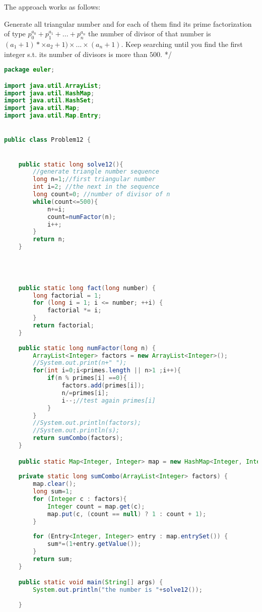 \begin{solution}
The approach works as follows:

Generate all triangular number and
for each of them find its prime factorization of type $p_0^{a_0} + p_1^{a_1} + ... + p_n^{a_n}$
the number of divisor of that number is $(a_1+1)*\times a_2+1)\times ... \times (a_n+1)$.
Keep searching until you find the first integer s.t. its number of divisors is more than $500$.
*/
		\begin{lstlisting}[language=Java, caption="Java"]
        package euler;

import java.util.ArrayList;
import java.util.HashMap;
import java.util.HashSet;
import java.util.Map;
import java.util.Map.Entry;


public class Problem12 {


	public static long solve12(){
		//generate triangle number sequence
		long n=1;//first triangular number
		int i=2; //the next in the sequence
		long count=0; //number of divisor of n
		while(count<=500){
			n+=i;
			count=numFactor(n);
			i++;
		}
		return n;
	}




	public static long fact(long number) {
	    long factorial = 1;
	    for (long i = 1; i <= number; ++i) {
	        factorial *= i;
	    }
	    return factorial;
	}
	
	public static long numFactor(long n) {
		ArrayList<Integer> factors = new ArrayList<Integer>();
		//System.out.print(n+" ");
		for(int i=0;i<primes.length || n>1 ;i++){
			if(n % primes[i] ==0){
				factors.add(primes[i]);
				n/=primes[i];
				i--;//test again primes[i]
			}
		}
		//System.out.println(factors);
		//System.out.println(s);
		return sumCombo(factors);
	}

	public static Map<Integer, Integer> map = new HashMap<Integer, Integer>();
	
	private static long sumCombo(ArrayList<Integer> factors) {
		map.clear();
		long sum=1;
		for (Integer c : factors){
			Integer count = map.get(c);
			map.put(c, (count == null) ? 1 : count + 1);
		}
		
		for (Entry<Integer, Integer> entry : map.entrySet()) {
			sum*=(1+entry.getValue());
		}
		return sum;
	}

	public static void main(String[] args) {
		System.out.println("the number is "+solve12());
		
	}
	
	
	

\end{lstlisting}
\end{solution}

